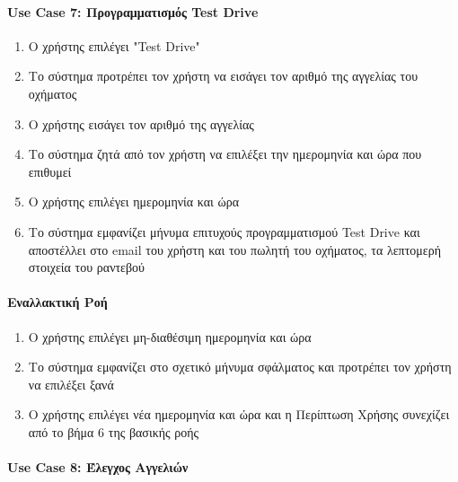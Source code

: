 \documentclass{../ol-softwaremanual}
\begin{document}
	\paragraph{\en Use Case 7: \gr Προγραμματισμός \en Test Drive \gr}
	
	\begin{enumerate}
		\item Ο χρήστης επιλέγει \en "Test Drive" \gr
		\item Το σύστημα προτρέπει τον χρήστη να εισάγει τον αριθμό της αγγελίας του οχήματος
		\item Ο χρήστης εισάγει τον αριθμό της αγγελίας
		\item Το σύστημα ζητά από τον χρήστη να επιλέξει την ημερομηνία και ώρα που επιθυμεί 
		\item Ο χρήστης επιλέγει ημερομηνία και ώρα
		\item Το σύστημα εμφανίζει μήνυμα επιτυχούς προγραμματισμού \en Test Drive \gr και αποστέλλει στο \en email \gr του χρήστη και του πωλητή του οχήματος, τα λεπτομερή στοιχεία του ραντεβού 
	\end{enumerate}

	\paragraph{Εναλλακτική Ροή }
	
	\begin{enumerate}
		\item Ο χρήστης επιλέγει μη-διαθέσιμη ημερομηνία και ώρα
		\item Το σύστημα εμφανίζει στο σχετικό μήνυμα σφάλματος και προτρέπει τον χρήστη να επιλέξει ξανά
		\item Ο χρήστης επιλέγει νέα ημερομηνία και ώρα και η Περίπτωση Χρήσης συνεχίζει από το βήμα 6 της βασικής ροής
	\end{enumerate}

    \paragraph{\en Use Case 8: \gr Έλεγχος Αγγελιών}
    
\end{document}
